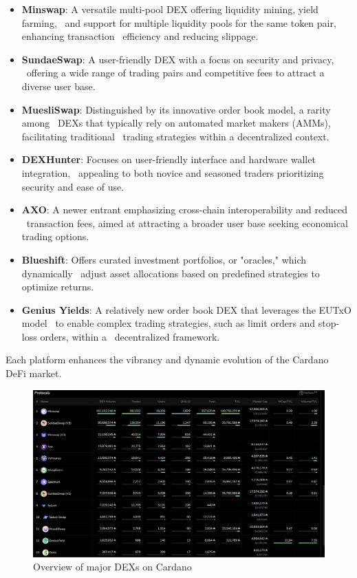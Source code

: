 \documentclass{scrreport}
\begin{document}
\begin{itemize}
  \item \textbf{Minswap}: A versatile multi-pool DEX offering liquidity mining, yield farming, \
  and support for multiple liquidity pools for the same token pair, enhancing transaction \
  efficiency and reducing slippage.
  \item \textbf{SundaeSwap}: A user-friendly DEX with a focus on security and privacy, \
  offering a wide range of trading pairs and competitive fees to attract a diverse user base.
  \item \textbf{MuesliSwap}: Distinguished by its innovative order book model, a rarity among \
  DEXs that typically rely on automated market makers (AMMs), facilitating traditional \
  trading strategies within a decentralized context.
  \item \textbf{DEXHunter}: Focuses on user-friendly interface and hardware wallet integration, \
  appealing to both novice and seasoned traders prioritizing security and ease of use.
  \item \textbf{AXO}: A newer entrant emphasizing cross-chain interoperability and reduced \
  transaction fees, aimed at attracting a broader user base seeking economical trading options.
  \item \textbf{Blueshift}: Offers curated investment portfolios, or "oracles," which dynamically \
  adjust asset allocations based on predefined strategies to optimize returns.
  \item \textbf{Genius Yields}: A relatively new order book DEX that leverages the EUTxO model \
  to enable complex trading strategies, such as limit orders and stop-loss orders, within a \
  decentralized framework.
\end{itemize}

Each platform enhances the vibrancy and dynamic evolution of the Cardano DeFi market.
\begin{figure}[H]
  \centering
  \includegraphics[width=\textwidth]{CardanoDEXs - List.jpg}
  \caption{Overview of major DEXs on Cardano}
  \label{fig:cardano_dex}
\end{figure}
\end{document}
